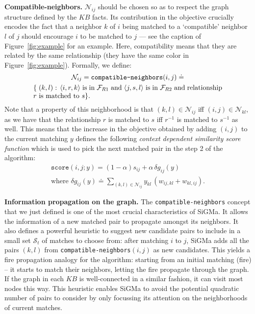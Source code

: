 \documentclass{sig-alternate}
\renewcommand{\tt}[1]{\texttt{#1}}
\newcommand{\ts}[1]{\textsf{#1}}
\newcommand{\KB}{K\!B}
\begin{document}
%
%
%
%
%
%

%

\textbf{Compatible-neighbors.} $\mathcal{N}_{ij}$ should be chosen so as to respect the graph structure defined by the $\KB$ facts. Its contribution in the objective crucially encodes the fact that a neighbor $k$ of $i$ being matched to a `compatible' neighbor $l$ of $j$ should encourage $i$ to be matched to $j$ --- see the caption of Figure~\ref{fig:example} for an example. Here, compatibility means that they are related by the same relationship (they have the same color in Figure~\ref{fig:example}). Formally, we define:
\begin{multline} \label{eq:compatible}
    \mathcal{N}_{ij} = \textrm{\tt{compatible-neighbors}}(i,j) \doteq \\
    \textrm{\parbox{0.8\columnwidth}{\{ $(k,l)$ : $\langle i,r,k \rangle$ is in $\mathcal{F}_{R1}$ and $\langle j,s,l \rangle$ is in $\mathcal{F}_{R2}$ and relationship $r$ is matched to $s$\}.}}
\end{multline}
Note that a property of this neighborhood is that $(k,l) \in \mathcal{N}_{ij}$ iff $(i,j) \in \mathcal{N}_{kl}$, as we have that the relationship $r$ is matched to $s$ iff $r^{-1}$ is matched to $s^{-1}$ as well. This means that the increase in the objective obtained by adding $(i,j)$ to the current matching $y$ defines the following \emph{context dependent similarity score function} which is used to pick the next matched pair in the step 2 of the algorithm:
    \begin{multline} \label{eq:score}
       \texttt{score}(i,j; y)  =  (1-\alpha) s_{ij} + \alpha \, \delta g_{ij}(y)   \\
        \textrm{where }  \delta g_{ij}(y)  \doteq \sum_{(k,l) \in \mathcal{N}_{ij}} y_{kl} \, (w_{ij,kl} + w_{kl,ij}).
    \end{multline}

\textbf{Information propagation on the graph.} The \tt{compati\-ble-neighbors} concept that we just defined is one of the most crucial characteristics of \ts{SiGMa}. It allows the information of a new matched pair to propagate amongst its neighbors. It also defines a powerful heuristic to suggest new candidate pairs to include in a small set $\mathcal{S}_t$ of matches to choose from: after matching $i$ to $j$, \ts{SiGMa} adds all the pairs $(k,l)$ from \tt{compatible-neighbors}$(i,j)$ as new candidates. This yields a fire propagation analogy for the algorithm: starting from an initial matching (fire) -- it starts to match their neighbors, letting the fire propagate through the graph. If the graph in each $\KB$ is well-connected in a similar fashion, it can visit most nodes this way. This heuristic enables \ts{SiGMa} to avoid the potential quadratic number of pairs to consider by only focussing its attention on the neighborhoods of current matches.
\end{document}

